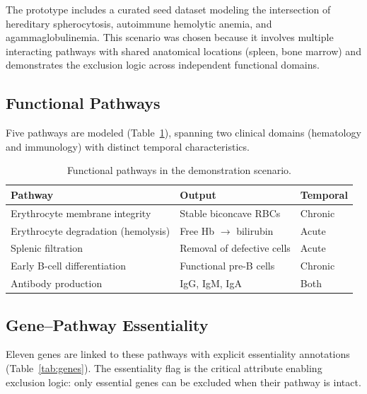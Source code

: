 \documentclass[12pt,a4paper]{article}
\begin{document}
The prototype includes a curated seed dataset modeling the intersection of hereditary spherocytosis, autoimmune hemolytic anemia, and agammaglobulinemia. This scenario was chosen because it involves multiple interacting pathways with shared anatomical locations (spleen, bone marrow) and demonstrates the exclusion logic across independent functional domains.

\subsection{Functional Pathways}

Five pathways are modeled (Table~\ref{tab:pathways}), spanning two clinical domains (hematology and immunology) with distinct temporal characteristics.

\begin{table}[H]
\centering
\caption{Functional pathways in the demonstration scenario.}
\label{tab:pathways}
\begin{tabular}{lll}
\toprule
\textbf{Pathway} & \textbf{Output} & \textbf{Temporal} \\
\midrule
Erythrocyte membrane integrity & Stable biconcave RBCs & Chronic \\
Erythrocyte degradation (hemolysis) & Free Hb $\to$ bilirubin & Acute \\
Splenic filtration & Removal of defective cells & Acute \\
Early B-cell differentiation & Functional pre-B cells & Chronic \\
Antibody production & IgG, IgM, IgA & Both \\
\bottomrule
\end{tabular}
\end{table}

\subsection{Gene--Pathway Essentiality}

Eleven genes are linked to these pathways with explicit essentiality annotations (Table~\ref{tab:genes}). The essentiality flag is the critical attribute enabling exclusion logic: only essential genes can be excluded when their pathway is intact.
\end{document}
